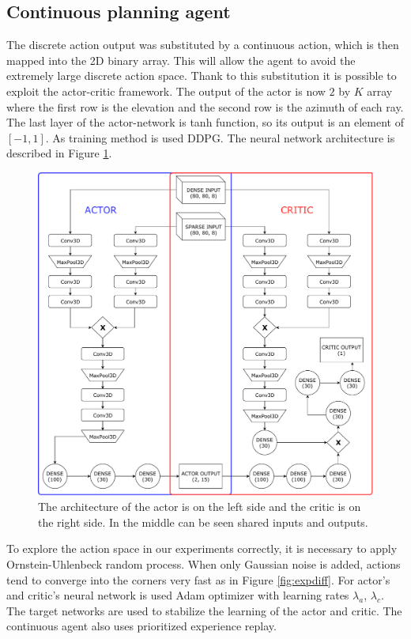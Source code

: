 \clearpage
\subsection{Continuous planning agent}
The discrete action output was substituted by a continuous action, which is then mapped into the 2D binary array. This will allow the agent to avoid the extremely large discrete action space. Thank to this substitution it is possible to exploit the actor-critic framework. The output of the actor is now $2$ by $K$ array where the first row is the elevation and the second row is the azimuth of each ray. The last layer of the actor-network is tanh function, so its output is an element of $[-1, 1]$. As training method is used DDPG. The neural network architecture is described in Figure \ref{fig:ddpg}.

\begin{figure}[!h]
\centering
\includegraphics[scale=0.55]{fig/ddpg.pdf}
\caption[DDPG architecture]{The architecture of the actor is on the left side and the critic is on the right side. In the middle can be seen shared inputs and outputs.}
\label{fig:ddpg}
\end{figure}

\pagebreak
To explore the action space in our experiments correctly, it is necessary to apply Ornstein-Uhlenbeck random process. When only Gaussian noise is added, actions tend to converge into the corners very fast as in Figure \ref{fig:expdiff}. For actor's and critic's neural network is used Adam optimizer with learning rates $\lambda_{a}$, $\lambda_{c}$. The target networks are used to stabilize the learning of the actor and critic. The continuous agent also uses prioritized experience replay.

